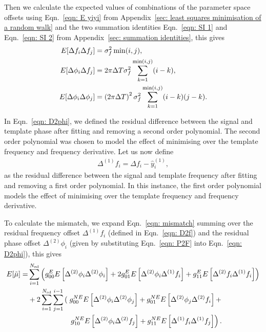 \documentclass[../full_thesis/full_thesis.tex]{subfiles}
\begin{document}
Then we calculate the expected values of combinations of the parameter space
offsets using Eqn.~\eqref{eqn: E yiyi} from Appendix~\ref{sec: least squares
minimisation of a random walk} and the two summation identities
Eqn.~\eqref{eqn: SI 1} and Eqn.~\eqref{eqn: SI 2} from Appendix~\ref{sec:
summation identities}, this gives
\begin{align}
E[\Delta f_{i}\Delta f_{j}] & = \sigma_{f}^{2} \min(i, j), \label{eqn: E1} \\
E[\Delta\phi_{i}\Delta f_{j}] & = 2 \pi \Delta T \sigma_{f}^{2} \sum_{k=1}^{\min(i, j)}(i-k), \label{eqn: E2}\\
E[\Delta\phi_{i}\Delta\phi_{j}] & =
\left(2\pi\Delta T\right)^{2}\sigma_{f}^{2} \sum_{k=1}^{\min(i, j)}(i-k)(j-k).
\label{eqn: E3}
\end{align}

In Eqn.~\eqref{eqn: D2phi}, we defined the residual difference between the signal
and template phase after fitting and removing a second order polynomial. The
second order polynomial was chosen to model the effect of minimising over the
template frequency and frequency derivative. Let us now define
\begin{align}
\Delta^{(1)}f_i = \Delta f_i - \hat{y}^{(1)}_i,
\label{eqn: D2f}
\end{align}
as the residual difference between the signal and template frequency after
fitting and removing a first order polynomial. In this instance, the first
order polynomial models the effect of minimising over the template
frequency and frequency derivative.

To calculate the mismatch, we expand Eqn.~\eqref{eqn: mismatch} summing over
the residual frequency offset $\Delta^{(1)}f_i$ (defined in Eqn.~\eqref{eqn:
D2f}) and the residual phase offset $\Delta^{(2)}\phi_i$ (given by
substituting Eqn.~\eqref{eqn: P2F} into Eqn.~\eqref{eqn: D2phi}), this gives
\begin{align}
\begin{split}
E[\mutilde] = &
\s{i=1}{\Nsd}\left(g_{00}^{E}E\left[\Delta^{(2)}\phi_{i}\Delta^{(2)}\phi_{i}\right]
+ 2 g_{01}^{E}E\left[\Delta^{(2)}\phi_{i}\Delta^{(1)}\f_{i}\right]
+  g_{11}^{E} E\left[\Delta^{(2)}\f_{i}\Delta^{(1)}\f_{i}\right] \right) \\
& + 2\s{i=1}{\Nsd}\s{j=1}{i-1}\left(\right.
g_{00}^{NE}E\left[\Delta^{(2)}\phi_{i}\Delta^{(2)}\phi_{j}\right] +
g_{01}^{NE}E\left[\Delta^{(2)}\phi_{j}\Delta^{(2)}\f_{i}\right] +  \\
&\hspace{20mm}\left. g_{10}^{NE}E\left[\Delta^{(2)}\phi_{i}\Delta^{(2)}\f_{j}\right] +
g_{11}^{NE} E\left[\Delta^{(1)}\f_{i}\Delta^{(1)}\f_{j}\right] \right).
\end{split}
\end{align}
\end{document}
